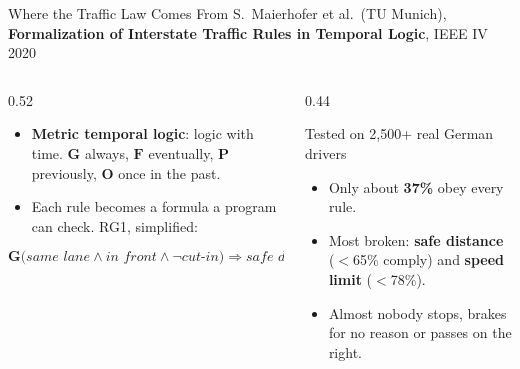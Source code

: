 \documentclass[aspectratio=169,10pt,xcolor=table]{beamer}
\begin{document}
\begin{frame}{Where the Traffic Law Comes From}
  {\footnotesize\color{ink2} S.~Maierhofer et al.\ (TU Munich), \textbf{Formalization of Interstate Traffic Rules in
  Temporal Logic}, IEEE IV 2020}
  \vspace{0.6em}

  \centering
  \vspace{0.6em}
  \raggedright
  \begin{columns}[T]
    \begin{column}{0.52\textwidth}
      \begin{itemize}\small
        \item \textbf{Metric temporal logic}: logic with time. $\mathbf{G}$ always, $\mathbf{F}$ eventually,
              $\mathbf{P}$ previously, $\mathbf{O}$ once in the past.
        \item Each rule becomes a formula a program can check. RG1, simplified:
      \end{itemize}
      \vspace{-0.2em}
      \[ \mathbf{G}\big(\textit{same lane} \wedge \textit{in front} \wedge \neg\textit{cut-in}\big)
         \Rightarrow \textit{safe distance} \]
    \end{column}
    \begin{column}{0.44\textwidth}
      \begin{block}{Tested on 2,500+ real German drivers}
        \footnotesize
        \begin{itemize}
          \item Only about \textbf{37\%} obey every rule.
          \item Most broken: \textbf{safe distance} ($<$65\% comply) and \textbf{speed limit} ($<$78\%).
          \item Almost nobody stops, brakes for no reason or passes on the right.
        \end{itemize}
      \end{block}
    \end{column}
  \end{columns}
\end{frame}
\end{document}
